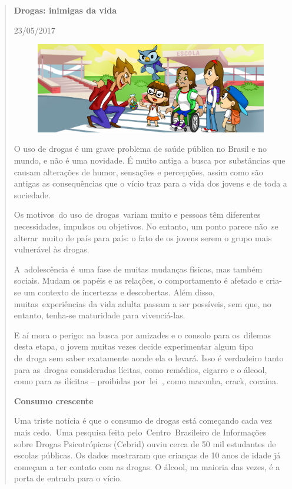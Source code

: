 \begin{quote}
\textbf{Drogas: inimigas da vida}

23/05/2017

\begin{figure}[htpb!]
\centering
\includegraphics[width=\textwidth]{./_SAEB_9_POR/media/image17.jpeg}
\caption{}
\end{figure}

O uso de drogas é um grave problema de saúde pública no Brasil e no
mundo, e não é uma novidade. É muito antiga a busca por substâncias que
causam alterações de humor, sensações e percepções, assim como são
antigas as consequências que o vício traz para a vida dos jovens e de
toda a sociedade.

Os motivos~do uso de drogas~variam muito e pessoas têm diferentes
necessidades, impulsos ou objetivos. No entanto, um ponto parece não~se
alterar~muito de país para país: o fato de os jovens serem o grupo mais
vulnerável às drogas.

A~adolescência é~uma fase de muitas mudanças físicas, mas também
sociais. Mudam os papéis e as relações, o comportamento é afetado e
cria-se um contexto de incertezas e descobertas. Além disso,
muitas~experiências da vida adulta passam a ser possíveis, sem que, no
entanto, tenha-se maturidade para vivenciá-las.

E aí mora o perigo: na busca por amizades e o consolo para os~dilemas
desta etapa, o jovem muitas vezes decide experimentar algum tipo
de~droga sem saber exatamente aonde ela o levará. Isso é verdadeiro
tanto para as~drogas consideradas lícitas, como remédios, cigarro e o
álcool, como para as ilícitas -- proibidas por~lei~, como maconha,
crack, cocaína.

\textbf{Consumo crescente}

Uma triste notícia é que o consumo de drogas está começando cada vez
mais cedo.~Uma pesquisa feita pelo~Centro~Brasileiro de Informações
sobre Drogas Psicotrópicas (Cebrid) ouviu cerca de 50 mil estudantes de
escolas públicas. Os dados mostraram que crianças de 10 anos de idade já
começam a ter contato com as drogas. O álcool, na maioria das vezes, é a
porta de entrada para o vício.


\end{quote}
